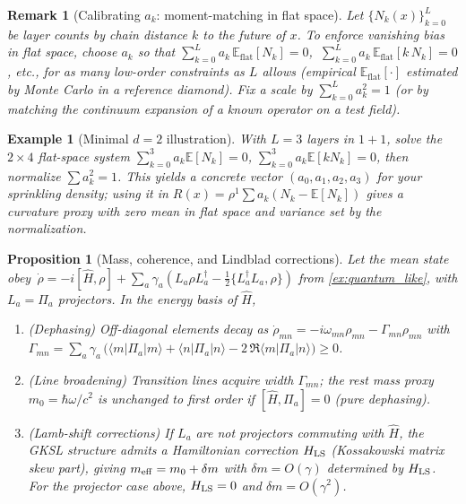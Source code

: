\documentclass[12pt,a4paper]{article}
\newtheorem{proposition}{Proposition}
\newtheorem{remark}{Remark}
\newtheorem{example}{Example}
\newcommand{\E}{\mathbb{E}}
\begin{document}
\begin{remark}[Calibrating $a_k$: moment-matching in flat space]
Let $\{N_k(x)\}_{k=0}^L$ be layer counts by chain distance $k$ to the future of $x$. To enforce vanishing bias in flat space, choose $a_k$ so that
$\sum_{k=0}^L a_k\,\E_{\text{flat}}[N_k]=0$, $\ \sum_{k=0}^L a_k\,\E_{\text{flat}}[k\,N_k]=0$, etc., for as many low-order constraints as $L$ allows (empirical $\E_{\text{flat}}[\cdot]$ estimated by Monte Carlo in a reference diamond). Fix a scale by $\sum_{k=0}^L a_k^2=1$ (or by matching the continuum expansion of a known operator on a test field).
\end{remark}

\begin{example}[Minimal $d{=}2$ illustration]
With $L=3$ layers in $1{+}1$, solve the $2{\times}4$ flat-space system 
$\sum_{k=0}^3 a_k \E[N_k]=0$, $\sum_{k=0}^3 a_k \E[k N_k]=0$, then normalize $\sum a_k^2=1$. This yields a concrete vector $(a_0,a_1,a_2,a_3)$ for your sprinkling density; using it in $R(x)=\rho^{1}\sum a_k (N_k-\E[N_k])$ gives a curvature proxy with zero mean in flat space and variance set by the normalization.
\end{example}

\begin{proposition}[Mass, coherence, and Lindblad corrections]\label{prop:mass_coh_refined}
Let the mean state obey $\,\dot\rho=-i[\hat H,\rho]+\sum_a\gamma_a\!\left(L_a\rho L_a^\dagger-\tfrac12\{L_a^\dagger L_a,\rho\}\right)$
from \cref{ex:quantum_like}, with $L_a=\Pi_a$ projectors. In the energy basis of $\hat H$,
\begin{enumerate}
\item[(i)] (Dephasing) Off-diagonal elements decay as $\dot \rho_{mn}=-i\omega_{mn}\rho_{mn} -\Gamma_{mn}\rho_{mn}$ with $\Gamma_{mn}=\sum_a\gamma_a\,\big(\langle m|\Pi_a|m\rangle+\langle n|\Pi_a|n\rangle - 2\,\Re\langle m|\Pi_a|n\rangle\big)\ge 0$.
\item[(ii)] (Line broadening) Transition lines acquire width $\Gamma_{mn}$; the rest mass proxy $m_0=\hbar\omega/c^2$ is unchanged to first order if $[\hat H,\Pi_a]=0$ (pure dephasing).
\item[(iii)] (Lamb-shift corrections) If $L_a$ are not projectors commuting with $\hat H$, the GKSL structure admits a Hamiltonian correction $H_{\rm LS}$ (Kossakowski matrix skew part), giving $m_{\rm eff}=m_0+\delta m$ with $\delta m=O(\gamma)$ determined by $H_{\rm LS}$. For the projector case above, $H_{\rm LS}=0$ and $\delta m=O(\gamma^2)$.
\end{enumerate}
\end{proposition}
\end{document}
